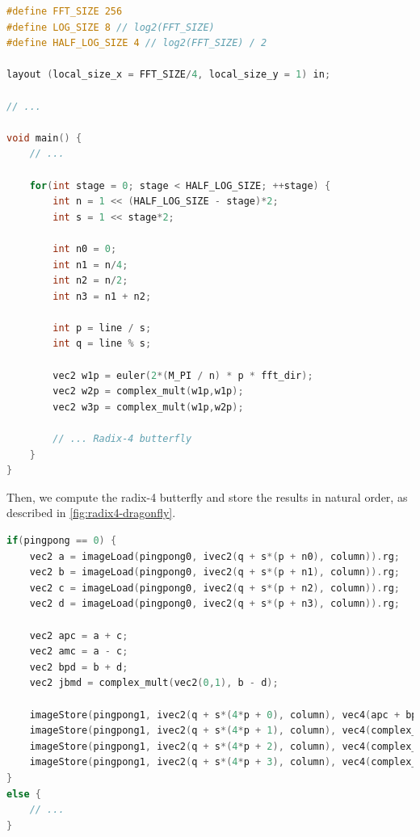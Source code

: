 \documentclass[
  oneside,
  11pt, a4paper,
  footinclude=true,
  headinclude=true,
  cleardoublepage=empty
]{scrbook}
\begin{document}
\begin{lstlisting}[language=C, caption={Radix-4 Stockham stage control variables}, label={lst:radaix4-stockham-control-vars}]
#define FFT_SIZE 256
#define LOG_SIZE 8 // log2(FFT_SIZE)
#define HALF_LOG_SIZE 4 // log2(FFT_SIZE) / 2

layout (local_size_x = FFT_SIZE/4, local_size_y = 1) in;

// ...

void main() {
    // ...

    for(int stage = 0; stage < HALF_LOG_SIZE; ++stage) {
        int n = 1 << (HALF_LOG_SIZE - stage)*2;
        int s = 1 << stage*2;

        int n0 = 0;
        int n1 = n/4;
        int n2 = n/2;
        int n3 = n1 + n2;

        int p = line / s; 
        int q = line % s;

        vec2 w1p = euler(2*(M_PI / n) * p * fft_dir);
        vec2 w2p = complex_mult(w1p,w1p);
        vec2 w3p = complex_mult(w1p,w2p);

        // ... Radix-4 butterfly
    }
}
\end{lstlisting}

Then, we compute the radix-4 butterfly and store the results in natural order, as described in \autoref{fig:radix4-dragonfly}.
\newline 

\begin{lstlisting}[language=C, caption={Radix-4 Stockham butterfly}, label={lst:radix4-stockham-dragonfly}]
if(pingpong == 0) {
    vec2 a = imageLoad(pingpong0, ivec2(q + s*(p + n0), column)).rg;
    vec2 b = imageLoad(pingpong0, ivec2(q + s*(p + n1), column)).rg;
    vec2 c = imageLoad(pingpong0, ivec2(q + s*(p + n2), column)).rg;
    vec2 d = imageLoad(pingpong0, ivec2(q + s*(p + n3), column)).rg;

    vec2 apc = a + c;
    vec2 amc = a - c;
    vec2 bpd = b + d;
    vec2 jbmd = complex_mult(vec2(0,1), b - d);

    imageStore(pingpong1, ivec2(q + s*(4*p + 0), column), vec4(apc + bpd, 0,0));
    imageStore(pingpong1, ivec2(q + s*(4*p + 1), column), vec4(complex_mult(w1p, amc - jbmd), 0,0));
    imageStore(pingpong1, ivec2(q + s*(4*p + 2), column), vec4(complex_mult(w2p, apc - bpd ), 0,0));
    imageStore(pingpong1, ivec2(q + s*(4*p + 3), column), vec4(complex_mult(w3p, amc + jbmd), 0,0));
}
else {
    // ...
}
\end{lstlisting}
\end{document}

